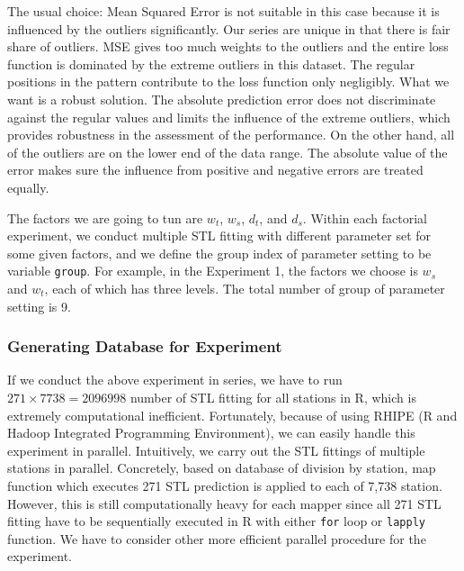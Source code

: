The usual choice: 
Mean Squared Error is not suitable in this case because it is influenced by the 
outliers significantly. Our series are unique in that there is fair share of 
outliers. MSE gives too much weights to the outliers and the entire loss function is
dominated by the extreme outliers in this dataset. The regular positions in the 
pattern contribute to the loss function only negligibly. What we want is a robust
solution. The absolute prediction error does not discriminate against the regular
values and limits the influence of the extreme outliers, which provides robustness 
in the assessment of the performance. On the other hand, all of the outliers are 
on the lower end of the data range. The absolute value of the error makes sure 
the influence from positive and negative errors are treated equally.

The factors we are going to tun are $w_t$, $w_s$, $d_t$, 
and $d_s$. Within each factorial experiment, we conduct multiple STL fitting with 
different parameter set for some given factors, and we define the group index of 
parameter setting to be variable \texttt{group}. For example, in the Experiment 1,
the factors we choose is $w_s$ and $w_t$, each of which has three levels. The 
total number of group of parameter setting is 9.

\subsubsection{Generating Database for Experiment}
\label{sec:a1950.stlexp}

If we conduct the above experiment in series, we have to run 
$271 \times 7738 = 2096998$ number of STL fitting for all stations in R, which is 
extremely computational inefficient. Fortunately, because of using RHIPE
(R and Hadoop Integrated Programming Environment), we can easily handle this 
experiment in parallel. Intuitively, we carry out the STL fittings of multiple 
stations in parallel. Concretely, based on database of division by station, map
function which executes 271 STL prediction is applied to each of 7,738 station.
However, this is still computationally heavy for each mapper since all 271 STL 
fitting have to be sequentially executed in R with either \texttt{for} loop or 
\texttt{lapply} function. We have to consider other more efficient parallel 
procedure for the experiment.


